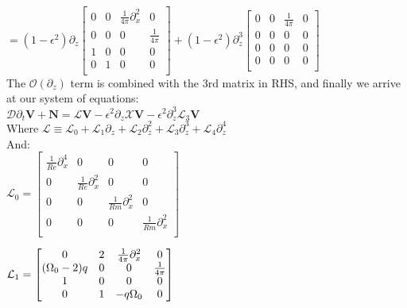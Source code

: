 \documentclass[letterpaper,12pt]{article}
\newcommand\reye{\mathrel{Re}}
\newcommand\reym{\mathrel{Rm}}
\begin{document}
$ = (1 - \epsilon^2)\partial_z\left[\begin{matrix}
0 & 0 & \frac{1}{4\pi}\partial_x^2 & 0 \\
0 & 0 & 0 & \frac{1}{4\pi} \\
1 & 0 & 0 & 0 \\
0 & 1 & 0 & 0 \\ \end{matrix} \right] + (1 - \epsilon^2)\partial_z^3 \left[\begin{matrix}
0 & 0 & \frac{1}{4\pi} & 0 \\
0 & 0 & 0 & 0 \\
0 & 0 & 0 & 0 \\
0 & 0 & 0 & 0 \\ \end{matrix} \right] $ \\

The $\mathcal{O}(\partial_z)$ term is combined with the 3rd matrix in RHS, and finally we arrive at our system of equations: \\

$\mathcal{D}\partial_t \mathbf{V} + \mathbf{N} = \mathcal{L} \mathbf{V} - \epsilon^2\partial_z\mathcal{X} \mathbf{V} - \epsilon^2 \partial_z^3 \mathcal{L}_3\mathbf{V}$ \\

Where $\mathcal{L} \equiv \mathcal{L}_0 + \mathcal{L}_1\partial_z + \mathcal{L}_2\partial_z^2 + \mathcal{L}_3\partial_z^3 + \mathcal{L}_4\partial_z^4$ \\

And: \\

$\mathcal{L}_0 = \left[\begin{matrix}
\frac{1}{\reye}\partial_x^4 & 0 & 0 & 0 \\
0 & \frac{1}{\reye}\partial_x^2 & 0 &0 \\
0 & 0 & \frac{1}{\reym}\partial_x^2 & 0 \\
0 & 0 & 0 & \frac{1}{\reym}\partial_x^2 \\ \end{matrix}\right] $ \\

\vspace{2mm}

$\mathcal{L}_1 = \left[\begin{matrix}
0 & 2 & \frac{1}{4\pi}\partial_x^2 & 0 \\
(\Omega_0 - 2)q & 0 & 0 & \frac{1}{4\pi} \\
1 & 0 & 0 & 0 \\
0 & 1 & -q\Omega_0 & 0 \\ \end{matrix}\right] \\$
\end{document}
